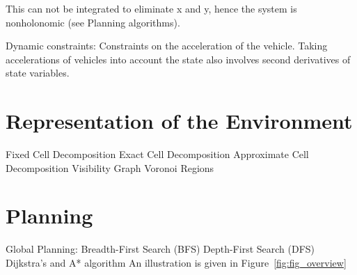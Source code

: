 This can not be integrated to eliminate x and y, hence the system is nonholonomic (see Planning algorithms).
  

Dynamic constraints:
Constraints on the acceleration of the vehicle.
Taking accelerations of vehicles into account the state also involves second derivatives of state variables.


\section{Representation of the Environment}\label{sec:representation}
Fixed Cell Decomposition
Exact Cell Decomposition
Approximate Cell Decomposition
Visibility Graph
Voronoi Regions

\section{Planning}\label{sec:global}
Global Planning:
Breadth-First Search (BFS)
Depth-First Search (DFS)
Dijkstra's and A* algorithm
An illustration is given in Figure~\ref{fig:fig_overview}
